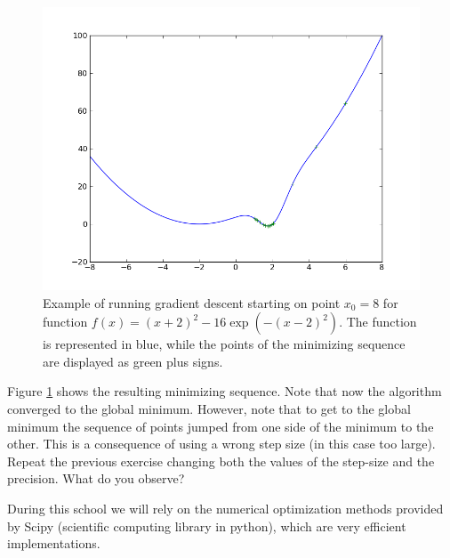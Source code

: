\begin{exercise}
\begin{figure}[h]
\begin{center}
   \includegraphics[width=1\columnwidth]{figs/intro/gradex2.png}
 \caption{\label{fig:gradex2} Example of running gradient descent
   starting on point $x_0 = 8$ for function $f(x) = (x+2)^2 - 16
   \exp\left( -(x-2)^2 \right)$. The function is represented in blue,
   while the points of the minimizing sequence are displayed as green
   plus signs.}
\end{center}
\end{figure}


Figure \ref{fig:gradex2} shows the resulting minimizing sequence. Note that now the algorithm converged to the global minimum. However, note that to get to the global minimum the sequence of points jumped from one side of the minimum to the other. This is a consequence of using a wrong step size (in this case too large). Repeat the previous exercise changing both the values of the step-size and the precision. What do you observe?
\end{exercise}

During this school we will rely on the numerical optimization methods provided by Scipy (scientific computing library in python), which are very efficient implementations.





